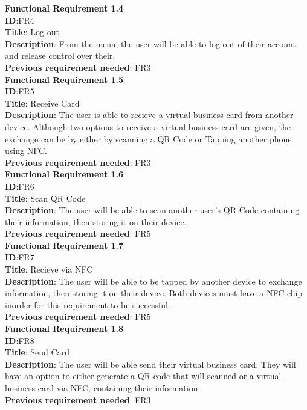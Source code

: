 \documentclass[english]{article}
\begin{document}
				\textbf{Functional Requirement 1.4}\\
				\textbf{ID}:FR4\\
				\textbf{Title}: Log out\\
				\textbf{Description}: From the menu, the user will be able to log out of their account and release control over their.\\
				\textbf{Previous requirement needed}: FR3\\
				
				\textbf{Functional Requirement 1.5}\\
				\textbf{ID}:FR5\\
				\textbf{Title}: Receive Card\\
				\textbf{Description}: The user is able to recieve a virtual business card from another device. Although two options to receive a virtual business card are given, the exchange can be by either by scanning a QR Code or Tapping another phone using NFC.\\
				\textbf{Previous requirement needed}: FR3\\
				
				\textbf{Functional Requirement 1.6}\\
				\textbf{ID}:FR6\\
				\textbf{Title}: Scan QR Code\\
				\textbf{Description}: The user will be able to scan another user's QR Code containing their information, then storing it on their device.\\
				\textbf{Previous requirement needed}: FR5\\
				
				\textbf{Functional Requirement 1.7}\\
				\textbf{ID}:FR7\\
				\textbf{Title}: Recieve via NFC\\
				\textbf{Description}: The user will be able to be tapped by another device to exchange information, then storing it on their device. Both devices must have a NFC chip inorder for this requirement to be successful.\\
				\textbf{Previous requirement needed}: FR5\\
				
				\textbf{Functional Requirement 1.8}\\
				\textbf{ID}:FR8\\
				\textbf{Title}: Send Card\\
				\textbf{Description}: The user will be able send their virtual business card. They will have an option to either generate a QR code that will scanned or a virtual business card via NFC, containing their information.\\
				\textbf{Previous requirement needed}: FR3\\
				
\end{document}
